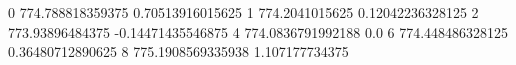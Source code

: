0 774.788818359375 0.70513916015625
1 774.2041015625 0.12042236328125
2 773.93896484375 -0.14471435546875
4 774.0836791992188 0.0
6 774.448486328125 0.36480712890625
8 775.1908569335938 1.107177734375
